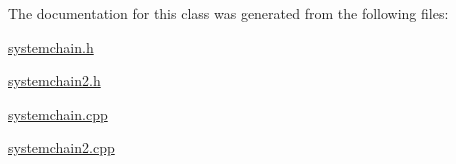The documentation for this class was generated from the following files\+:\begin{DoxyCompactItemize}
\item 
\hyperlink{systemchain_8h}{systemchain.\+h}\item 
\hyperlink{systemchain2_8h}{systemchain2.\+h}\item 
\hyperlink{systemchain_8cpp}{systemchain.\+cpp}\item 
\hyperlink{systemchain2_8cpp}{systemchain2.\+cpp}\end{DoxyCompactItemize}
